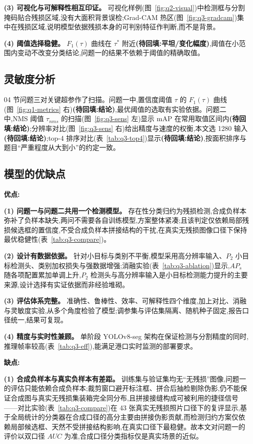 \textbf{(3) 可视化与可解释性相互印证。} 可视化样例(图~\ref{fig:q2-visual})中检测框与分割掩码贴合残损区域,没有大面积背景误检;Grad-CAM 热区(图~\ref{fig:q3-gradcam})集中在残损区域,说明模型依据残损本身的可判别特征作判断,而不是背景。

\textbf{(4) 阈值选择稳健。} $F_1(\tau)$ 曲线在 $\tau^{*}$ 附近\textbf{(待回填:平坦/变化幅度)},阈值在小范围内变动不改变分类结论,问题一的结果不依赖于阈值的精确取值。

\subsection{灵敏度分析}

04 节问题三对关键超参作了扫描。问题一中,置信度阈值 $\tau$ 的 $F_1(\tau)$ 曲线(图~\ref{fig:q1-metrics} 右)\textbf{(待回填:结论)},最优阈值的选取有实验依据。问题二中,NMS 阈值 $\tau_{nms}$ 的扫描(图~\ref{fig:q3-sens} 左)显示 mAP 在常用取值区间内\textbf{(待回填:结论)};分辨率对比(图~\ref{fig:q3-sens} 右)给出精度与速度的权衡,本文选 1280 输入\textbf{(待回填:结论)};top-4 排序对比(表~\ref{tab:q3-top4})显示\textbf{(待回填:结论)},按面积排序与题目“严重程度从大到小”的约定一致。

\subsection{模型的优缺点}

\textbf{优点:}

\textbf{(1) 问题一与问题二共用一个检测模型。} 存在性分类归约为残损检测,合成负样本弥补了负样本缺失,两问不需要各自训练模型,方案整体紧凑;且该判定仅依赖局部残损候选框的置信度,不受合成负样本拼接结构的干扰,在真实无残损图像口径下保持最优稳健性(表~\ref{tab:q3-compare})。

\textbf{(2) 设计有数据依据。} 针对小目标与类别不平衡,模型采用高分辨率输入、$P_2$ 小目标检测头、类别加权损失与强数据增强;消融实验(表~\ref{tab:q3-ablation})显示,$AP_s$ 随各项配置累加单调上升,$P_2$ 检测头与高分辨率输入是小目标检测能力提升的主要来源,设计选择有实证依据而非经验堆砌。

\textbf{(3) 评估体系完整。} 准确性、鲁棒性、效率、可解释性四个维度,加上对比、消融与灵敏度实验,从多个角度检验了模型;调参集与评估集隔离、随机种子固定,报告口径统一,结果可复现。

\textbf{(4) 精度与实时性兼顾。} 单阶段 YOLOv8-seg 架构在保证检测与分割精度的同时,推理帧率较高(表~\ref{tab:q3-eff}),能满足港口实时监测的部署要求。

\textbf{缺点:}

\textbf{(1) 合成负样本与真实负样本有差距。} 训练集与验证集均无“无残损”图像,问题一的评估只能依赖合成负样本;裁剪窗口避开标注框、拼合后抽检剔除伪影,仍不能保证合成图与真实无残损集装箱完全同分布,且拼接接缝构成可被利用的捷径信号——对比实验(表~\ref{tab:q3-compare})在 43 张真实无残损照片口径下的复评显示,基于全局统计的分类器在合成口径的高分主要由拼接伪影贡献,而检测归约方案仅依赖局部候选框、天然不受拼接结构影响,在真实口径下最稳健。故本文对问题一的评价以双口径 $AUC$ 为准,合成口径分类指标仅是真实场景的近似。

